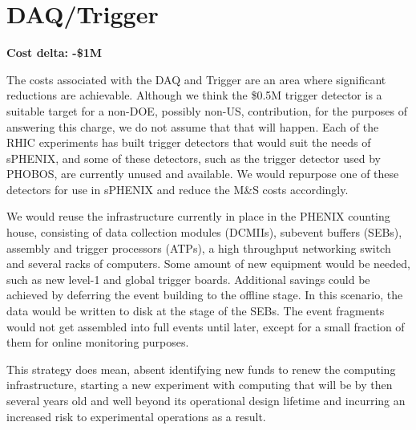 \section{DAQ/Trigger}
\label{daq}

\textbf{Cost delta: -\$1M}

The costs associated with the DAQ and Trigger are an area where
significant reductions are achievable.  Although we think the
\$0.5M trigger detector is a suitable target for a non-DOE, possibly
non-US, contribution, for the purposes of answering this charge, we do
not assume that that will happen.  Each of the RHIC experiments has
built trigger detectors that would suit the needs of sPHENIX, and some
of these detectors, such as the trigger detector used by PHOBOS, are
currently unused and available.  We would repurpose one of these
detectors for use in sPHENIX and reduce the M\&S costs accordingly.

We would reuse the infrastructure currently in place in the PHENIX
counting house, consisting of data collection modules (DCMIIs),
subevent buffers (SEBs), assembly and trigger processors (ATPs), a
high throughput networking switch and several racks of computers.
Some amount of new equipment would be needed, such as new level-1 and
global trigger boards.  Additional savings could be achieved by
deferring the event building to the offline stage. In this scenario,
the data would be written to disk at the stage of the SEBs. The event
fragments would not get assembled into full events until later, except
for a small fraction of them for online monitoring purposes.

This strategy does mean, absent identifying new funds to renew the
computing infrastructure, starting a new experiment with computing
that will be by then several years old and well beyond its operational
design lifetime and incurring an increased risk to experimental
operations as a result.



